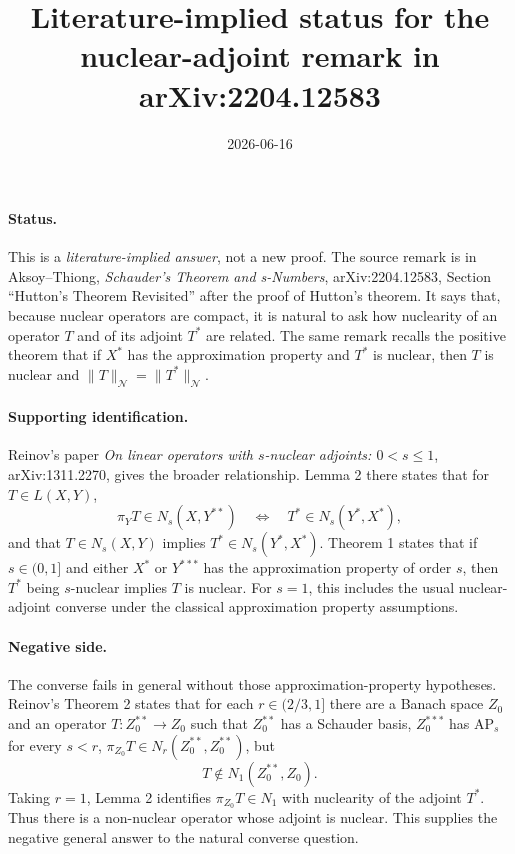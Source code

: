 \documentclass[11pt]{article}
\title{Literature-implied status for the nuclear-adjoint remark in arXiv:2204.12583}
\author{}
\date{2026-06-16}
\newcommand{\AP}{\mathrm{AP}}
\begin{document}
\maketitle

\paragraph{Status.}
This is a \emph{literature-implied answer}, not a new proof.  The source
remark is in Aksoy--Thiong, \emph{Schauder's Theorem and s-Numbers},
arXiv:2204.12583, Section ``Hutton's Theorem Revisited'' after the proof of
Hutton's theorem.  It says that, because nuclear operators are compact, it is
natural to ask how nuclearity of an operator \(T\) and of its adjoint \(T^*\)
are related.  The same remark recalls the positive theorem that if \(X^*\) has
the approximation property and \(T^*\) is nuclear, then \(T\) is nuclear and
\(\|T\|_{\mathcal N}=\|T^*\|_{\mathcal N}\).

\paragraph{Supporting identification.}
Reinov's paper \emph{On linear operators with \(s\)-nuclear adjoints:
\(0<s\le 1\)}, arXiv:1311.2270, gives the broader relationship.  Lemma 2
there states that for \(T\in L(X,Y)\),
\[
  \pi_Y T\in N_s(X,Y^{**}) \quad\Longleftrightarrow\quad
  T^*\in N_s(Y^*,X^*),
\]
and that \(T\in N_s(X,Y)\) implies \(T^*\in N_s(Y^*,X^*)\).  Theorem 1 states
that if \(s\in(0,1]\) and either \(X^*\) or \(Y^{***}\) has the approximation
property of order \(s\), then \(T^*\) being \(s\)-nuclear implies \(T\) is
nuclear.  For \(s=1\), this includes the usual nuclear-adjoint converse under
the classical approximation property assumptions.

\paragraph{Negative side.}
The converse fails in general without those approximation-property hypotheses.
Reinov's Theorem 2 states that for each \(r\in(2/3,1]\) there are a Banach
space \(Z_0\) and an operator \(T:Z_0^{**}\to Z_0\) such that \(Z_0^{**}\) has
a Schauder basis, \(Z_0^{***}\) has \(\AP_s\) for every \(s<r\),
\(\pi_{Z_0}T\in N_r(Z_0^{**},Z_0^{**})\), but
\[
  T\notin N_1(Z_0^{**},Z_0).
\]
Taking \(r=1\), Lemma 2 identifies \(\pi_{Z_0}T\in N_1\) with nuclearity of
the adjoint \(T^*\).  Thus there is a non-nuclear operator whose adjoint is
nuclear.  This supplies the negative general answer to the natural converse
question.
\end{document}
